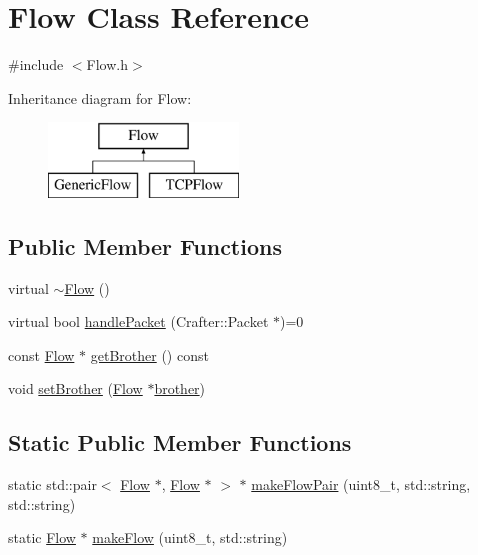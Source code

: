 \hypertarget{class_flow}{}\section{Flow Class Reference}
\label{class_flow}


{\ttfamily \#include $<$Flow.\+h$>$}

Inheritance diagram for Flow\+:\begin{figure}[H]
\begin{center}
\leavevmode
\includegraphics[height=2.000000cm]{class_flow}
\end{center}
\end{figure}
\subsection*{Public Member Functions}
\begin{DoxyCompactItemize}
\item 
virtual \hyperlink{class_flow_a5991efa6e8cf88c4ef2125cc727db333}{$\sim$\+Flow} ()
\item 
virtual bool \hyperlink{class_flow_aabcb243e3a9c04c1eb9b1090a3520544}{handle\+Packet} (Crafter\+::\+Packet $\ast$)=0
\item 
const \hyperlink{class_flow}{Flow} $\ast$ \hyperlink{class_flow_a30c028250e76e2c76837b19791185733}{get\+Brother} () const 
\item 
void \hyperlink{class_flow_ac41cf6542a8ef14cae38ed131d34dbb9}{set\+Brother} (\hyperlink{class_flow}{Flow} $\ast$\hyperlink{class_flow_aa8076d1b48c6de5c736bc64164d15320}{brother})
\end{DoxyCompactItemize}
\subsection*{Static Public Member Functions}
\begin{DoxyCompactItemize}
\item 
static std\+::pair$<$ \hyperlink{class_flow}{Flow} $\ast$, \hyperlink{class_flow}{Flow} $\ast$ $>$ $\ast$ \hyperlink{class_flow_aa3e211d010942314d8811879bb87e191}{make\+Flow\+Pair} (uint8\+\_\+t, std\+::string, std\+::string)
\item 
static \hyperlink{class_flow}{Flow} $\ast$ \hyperlink{class_flow_a46a48b06f94913c9d3ea42ca16b14794}{make\+Flow} (uint8\+\_\+t, std\+::string)
\end{DoxyCompactItemize}
